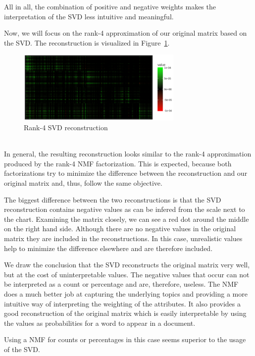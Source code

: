 \documentclass{support/acm_proc_article-sp}
\begin{document}
    All in all, the combination of positive and negative weights makes the interpretation of the SVD less
    intuitive and meaningful.

    Now, we will focus on the rank-4 approximation of our original matrix based on the SVD\@.
    The reconstruction is visualized in Figure~\ref{fig:1c-reconstruction}.
    \begin{figure}[htbp]
        \centering
        \includegraphics[width=8cm]{images/1c-reconstruction.png}
        \caption{Rank-4 SVD reconstruction}
        \label{fig:1c-reconstruction}
    \end{figure} \\
    In general, the resulting reconstruction looks similar to the rank-4 approximation produced by the rank-4 NMF
    factorization.
    This is expected, because both factorizations try to minimize the difference between the reconstruction and our
    original matrix and, thus, follow the same objective.

    The biggest difference between the two reconstructions is that the SVD reconstruction contains negative values as
    can be infered from the scale next to the chart.
    Examining the matrix closely, we can see a red dot around the middle on the right hand side.
    Although there are no negative values in the original matrix they are included in the reconstructions.
    In this case, unrealistic values help to minimize the difference elsewhere and are therefore included.

    We draw the conclusion that the SVD reconstructs the original matrix very well, but at the cost of uninterpretable
    values.
    The negative values that occur can not be interpreted as a count or percentage and are, therefore, useless.
    The NMF does a much better job at capturing the underlying topics and providing a more intuitive way of interpreting
    the weighting of the attributes.
    It also provides a good reconstruction of the original matrix which is easily interpretable by using the values
    as probabilities for a word to appear in a document.

    Using a NMF for counts or percentages in this case seems superior to the usage of the SVD\@.
\end{document}
